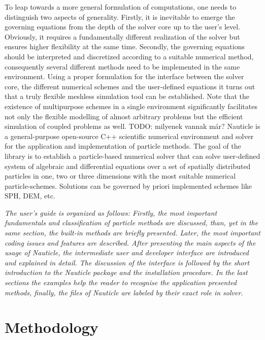 \documentclass[a4paper,12pt,openany]{book}
\theoremstyle{break}
\begin{document}
To leap towards a more general formulation of computations, one needs to distinguish two aspects of generality. Firstly, it is inevitable to emerge the governing equations from the depth of the solver core up to the user's level. Obviously, it requires a fundamentally different realization of the solver but ensures higher flexibility at the same time. Secondly, the governing equations should be interpreted and discretized according to a suitable numerical method, consequently several different methods need to be implemented in the same environment. Using a proper formulation for the interface between the solver core, the different numerical schemes and the user-defined equations it turns out that a truly flexible meshless simulation tool can be established. Note that the existence of multipurpose schemes in a single environment significantly facilitates  not only the flexible modelling of almost arbitrary problems but the efficient simulation of coupled problems as well.
TODO: milyenek vannak már?
Nauticle is a general-purpose open-source C++ scientific numerical environment and solver for the application and implementation of particle methods. The goal of the library is to  establish a particle-based numerical solver that can solve user-defined system of algebraic and differential equations over a set of spatially distributed particles in one, two or three dimensions with the most suitable numerical particle-schemes. Solutions can be governed by priori implemented schemes like SPH, DEM, etc.

\textit{The user's guide is organized as follows: Firstly, the most important fundamentals and classification of particle methods are discussed, than, yet in the same section, the built-in methods are briefly presented. Later, the most important coding issues and features are described. After presenting the main aspects of the usage of Nauticle, the intermediate user and developer interface are introduced and explained in detail. The discussion of the interface is followed by the short introduction to the Nauticle package and the installation procedure. In the last sections the examples help the reader to recognise the application presented methods, finally, the files of Nauticle are labeled by their exact role in solver.}

\section{Methodology}
\end{document}

